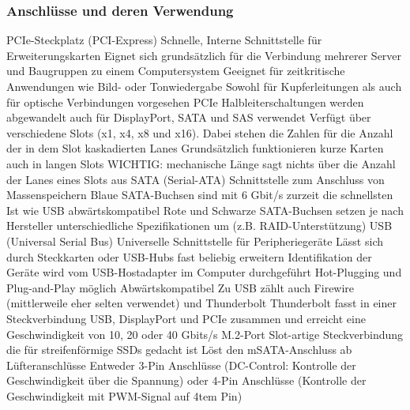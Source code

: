 \documentclass[10pt]{article}
\begin{document}
\begin{flushleft}
\begin{table}[H]
\begin{tabular}{|p{}|p{}|}
        \\\hline
    \end{tabular}
\end{table}

\subsubsection{Anschlüsse und deren Verwendung}

\begin{outline}
    \1 PCIe-Steckplatz (PCI-Express)
        \2 Schnelle, Interne Schnittstelle für Erweiterungskarten
        \2 Eignet sich grundsätzlich für die Verbindung mehrerer Server und Baugruppen zu einem Computersystem
        \2 Geeignet für zeitkritische Anwendungen wie Bild- oder Tonwiedergabe
        \2 Sowohl für Kupferleitungen als auch für optische Verbindungen vorgesehen
        \2 PCIe Halbleiterschaltungen werden abgewandelt auch für DisplayPort, SATA und SAS verwendet
        \2 Verfügt über verschiedene Slots (x1, x4, x8 und x16). Dabei stehen die Zahlen für die Anzahl der in dem Slot kaskadierten Lanes
        \2 Grundsätzlich funktionieren kurze Karten auch in langen Slots
        \2 WICHTIG: mechanische Länge sagt nichts über die Anzahl der Lanes eines Slots aus
    \1 SATA (Serial-ATA)
        \2 Schnittstelle zum Anschluss von Massenspeichern
        \2 Blaue SATA-Buchsen sind mit 6 Gbit/s zurzeit die schnellsten
        \2 Ist wie USB abwärtskompatibel
        \2 Rote und Schwarze SATA-Buchsen setzen je nach Hersteller unterschiedliche Spezifikationen um (z.B. RAID-Unterstützung)
    \1 USB (Universal Serial Bus)
        \2 Universelle Schnittstelle für Peripheriegeräte
        \2 Lässt sich durch Steckkarten oder USB-Hubs fast beliebig erweitern
        \2 Identifikation der Geräte wird vom USB-Hostadapter im Computer durchgeführt
        \2 Hot-Plugging und Plug-and-Play möglich
        \2 Abwärtskompatibel
        \2 Zu USB zählt auch Firewire (mittlerweile eher selten verwendet) und Thunderbolt
        \2 Thunderbolt fasst in einer Steckverbindung USB, DisplayPort und PCIe zusammen und erreicht eine Geschwindigkeit von 10, 20 oder 40 Gbits/s
    \1 M.2-Port
        \2 Slot-artige Steckverbindung die für streifenförmige SSDs gedacht ist
        \2 Löst den mSATA-Anschluss ab
    \1 Lüfteranschlüsse
        \2 Entweder 3-Pin Anschlüsse (DC-Control: Kontrolle der Geschwindigkeit über die Spannung) oder 4-Pin Anschlüsse (Kontrolle der Geschwindigkeit mit PWM-Signal auf 4tem Pin)
        
\end{outline}


\end{flushleft}
\end{document}
